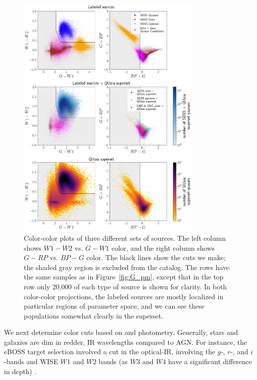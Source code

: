 \begin{figure}[p]
    \centering
    \includegraphics[width=0.8\textwidth]{color_color.png}

    \caption{Color-color plots of three different sets of sources. The left column shows $W1-W2$ vs. $G-W1$ color, and the right column shows $G-RP$ vs. $BP-G$ color. The black lines show the cuts we make; the shaded gray region is excluded from the catalog. The rows have the same samples as in Figure~\ref{fig:G_pm}, except that in the top row only 20,000 of each type of \SDSS source is shown for clarity. In both color-color projections, the labeled sources are mostly localized in particular regions of parameter space, and we can see these populations somewhat clearly in the \cat superset.} 
    \label{fig:color_color}
\end{figure}

We next determine color cuts based on \Gaia and \unWISE photometry.
Generally, stars and galaxies are dim in redder, IR wavelengths compared to AGN.
For instance, the eBOSS target selection involved a cut in the optical-IR, involving the \SDSS $g$-, $r$-, and $i$-bands and WISE $W1$ and $W2$ bands (as $W3$ and $W4$ have a significant difference in depth) \citep{myers_target_2022}. 

